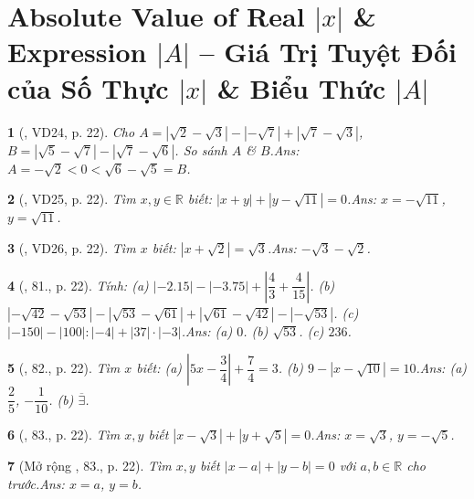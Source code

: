 \documentclass{article}
\newtheorem{baitoan}{}
\begin{document}

\section{Absolute Value of Real $|x|$ \& Expression $|A|$ -- Giá Trị Tuyệt Đối của  Số Thực $|x|$ \& Biểu Thức $|A|$}

\begin{baitoan}[\cite{Tuyen_Toan_7}, VD24, p. 22]
	Cho $A = |\sqrt{2} - \sqrt{3}| - |-\sqrt{7}| + |\sqrt{7} - \sqrt{3}|$, $B = |\sqrt{5} - \sqrt{7}| - |\sqrt{7} - \sqrt{6}|$. So sánh $A$ \& $B$.\hfill{\sf Ans:} $A = -\sqrt{2} < 0 < \sqrt{6} - \sqrt{5} = B$.
\end{baitoan}	

\begin{baitoan}[\cite{Tuyen_Toan_7}, VD25, p. 22]
	Tìm $x,y\in\mathbb{R}$ biết: $|x + y| + |y - \sqrt{11}| = 0$.\hfill{\sf Ans:} $x = -\sqrt{11}$, $y = \sqrt{11}$.
\end{baitoan}

\begin{baitoan}[\cite{Tuyen_Toan_7}, VD26, p. 22]
	Tìm $x$ biết: $|x + \sqrt{2}| = \sqrt{3}$.\hfill{\sf Ans:} $-\sqrt{3} - \sqrt{2}$.
\end{baitoan}

\begin{baitoan}[\cite{Tuyen_Toan_7}, 81., p. 22]
	Tính: (a) $|-2.15| - |-3.75| + \left|\dfrac{4}{3} + \dfrac{4}{15}\right|$. (b) $|-\sqrt{42} - \sqrt{53}| - |\sqrt{53} - \sqrt{61}| + |\sqrt{61} - \sqrt{42}| - |-\sqrt{53}|$. (c) $|-150| - |100|:|-4| + |37|\cdot|-3|$.\hfill{\sf Ans:} (a) $0$. (b) $\sqrt{53}$. (c) $236$.
\end{baitoan}

\begin{baitoan}[\cite{Tuyen_Toan_7}, 82., p. 22]
	Tìm $x$ biết: (a) $\left|5x - \dfrac{3}{4}\right| + \dfrac{7}{4} = 3$. (b) $9 - |x - \sqrt{10}| = 10$.\hfill{\sf Ans:} (a) $\dfrac{2}{5}$, $-\dfrac{1}{10}$. (b) $\overline{\exists}$.
\end{baitoan}

\begin{baitoan}[\cite{Tuyen_Toan_7}, 83., p. 22]
	Tìm $x,y$ biết $|x - \sqrt{3}| + |y + \sqrt{5}| = 0$.\hfill{\sf Ans:} $x = \sqrt{3}$, $y = -\sqrt{5}$.
\end{baitoan}

\begin{baitoan}[Mở rộng \cite{Tuyen_Toan_7}, 83., p. 22]
	Tìm $x,y$ biết $|x - a| + |y - b| = 0$ với $a,b\in\mathbb{R}$ cho trước.\hfill{\sf Ans:} $x = a$, $y = b$.
\end{baitoan}
\end{document}
